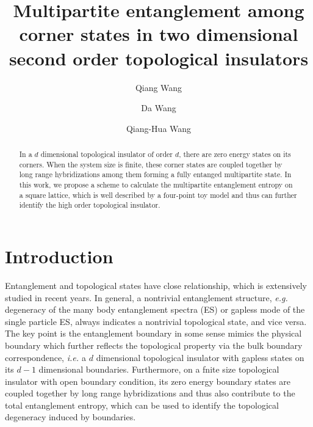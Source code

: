 \documentclass[aps,twocolumn,superscriptaddress]{revtex4-1}
\newcommand{\ie}{\textit{i.e.{ }}}
\newcommand{\eg}{\textit{e.g.{ }}}
\begin{document}
\title{Multipartite entanglement among corner states in two dimensional second order topological insulators}
\author{Qiang Wang}
\author{Da Wang}
\author{Qiang-Hua Wang}

\begin{abstract}
  In a $d$ dimensional topological insulator of order $d$, there are zero energy states on its corners.
  When the system size is finite, these corner states are coupled together by long range hybridizations among them 
  forming a fully entanged multipartite state. In this work, we propose a scheme to calculate the multipartite
  entanglement entropy on a square lattice, which is well described by a four-point toy model and thus can further 
  identify the high order topological insulator.
\end{abstract}
\maketitle
\section{Introduction}
Entanglement and topological states have close relationship, which is extensively studied in recent years.
\cite{Zeng2015,Laflorencie2017}
In general, a nontrivial entanglement structure, \eg degeneracy of the many body entanglement spectra (ES) or gapless
mode of the single particle ES, always indicates a nontrivial topological state, and vice versa.
\cite{Ryu2006, Fidkowski2010}
The key point is the entanglement boundary in some sense mimics the physical boundary which further reflects the
topological property via the bulk boundary correspondence, \ie a $d$ dimensional topological insulator with gapless
states on its $d-1$ dimensional boundaries. 
Furthermore, on a fnite size topological insulator with open boundary condition, its zero energy boundary states are
coupled together by long range hybridizations and thus also contribute to the total entanglement entropy, 
which can be used to identify the topological degeneracy induced by boundaries. \cite{Wang2015}
\end{document}
